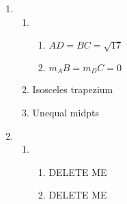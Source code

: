 \begin{enumerate}[noitemsep, label=\textbf{\arabic*}. ]
\item %
 \begin{enumerate}[noitemsep, label=\textbf{(\alph*)} ]
\item %
\begin{enumerate}[noitemsep, label=\textbf{\roman*}. ] 
\item $AD = BC = \sqrt{17}$%
\item $m_AB = m_DC = 0$%
\end{enumerate}
\item Isosceles trapezium%
\item Unequal midpts%
\end{enumerate}
\item %
 \begin{enumerate}[noitemsep, label=\textbf{(\alph*)} ]

\item %
\begin{enumerate}[noitemsep, label=\textbf{\roman*}. ] 

\item DELETE ME%
\item DELETE ME%
\end{enumerate}


\end{enumerate}
\end{enumerate}
